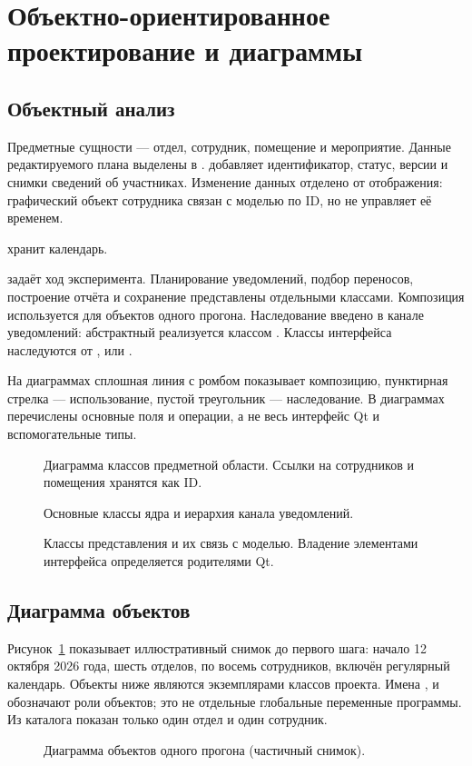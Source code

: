 \section{Объектно-ориентированное проектирование и диаграммы}
\subsection{Объектный анализ}
Предметные сущности --- отдел, сотрудник, помещение и мероприятие. Данные редактируемого плана выделены в .  добавляет идентификатор, статус, версии и снимки сведений об участниках. Изменение данных отделено от отображения: графический объект сотрудника связан с моделью по ID, но не управляет её временем.

 хранит календарь.\par
{} задаёт ход эксперимента. Планирование уведомлений, подбор переносов, построение отчёта и сохранение представлены отдельными классами. Композиция используется для объектов одного прогона. Наследование введено в канале уведомлений: абстрактный  реализуется классом . Классы интерфейса наследуются от ,  или .

На диаграммах сплошная линия с ромбом показывает композицию, пунктирная стрелка --- использование, пустой треугольник --- наследование. В диаграммах перечислены основные поля и операции, а не весь интерфейс Qt и вспомогательные типы.

\begin{figure}[H]\centering

\caption{Диаграмма классов предметной области. Ссылки на сотрудников и помещения хранятся как ID.}
\end{figure}
\begin{figure}[H]\centering

\caption{Основные классы ядра и иерархия канала уведомлений.}
\end{figure}
\begin{figure}[H]\centering

\caption{Классы представления и их связь с моделью. Владение элементами интерфейса определяется родителями Qt.}
\end{figure}

\subsection{Диаграмма объектов}
Рисунок~\ref{fig:objects} показывает иллюстративный снимок до первого шага: начало 12 октября 2026 года, шесть отделов, по восемь сотрудников, включён регулярный календарь. Объекты ниже являются экземплярами классов проекта. Имена ,  и  обозначают роли объектов; это не отдельные глобальные переменные программы. Из каталога показан только один отдел и один сотрудник.
\begin{figure}[H]\centering

\caption{Диаграмма объектов одного прогона (частичный снимок).}\label{fig:objects}
\end{figure}

